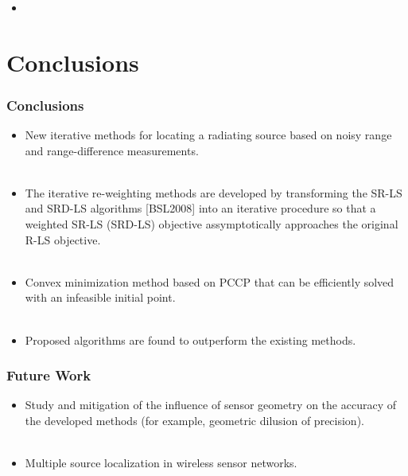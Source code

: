 \documentclass [t] {beamer} %
\begin{document}
\begin{frame} %
\frametitle{}
\phantom{m}
\begin{itemize}
\item

\end{itemize}
\end{frame}
\section{Conclusions} 

\begin{frame}
\frametitle{Conclusions} 
\phantom{m}
\begin{itemize}
\item
New iterative methods for locating a radiating source based on noisy range and range-difference measurements.
\\~\\
\item
The iterative re-weighting methods are developed by transforming the SR-LS and SRD-LS algorithms [BSL2008] into an iterative procedure so that a weighted SR-LS (SRD-LS) objective assymptotically
approaches the original R-LS objective.
\\~\\
\item
Convex minimization method based on PCCP that can be efficiently solved with an infeasible initial point.
\\~\\
\item
Proposed algorithms are found to outperform the existing methods.
\end{itemize}
\end{frame}

\begin{frame} %
\frametitle{Future Work}
\phantom{m}
\phantom{m}
\phantom{m}
\begin{itemize}
\item
Study and mitigation of the influence of sensor geometry on the accuracy of the developed methods (for example, geometric dilusion of precision).
\\~\\
\item
Multiple source localization in wireless sensor networks.
\end{itemize}
\end{frame}
\end{document}
